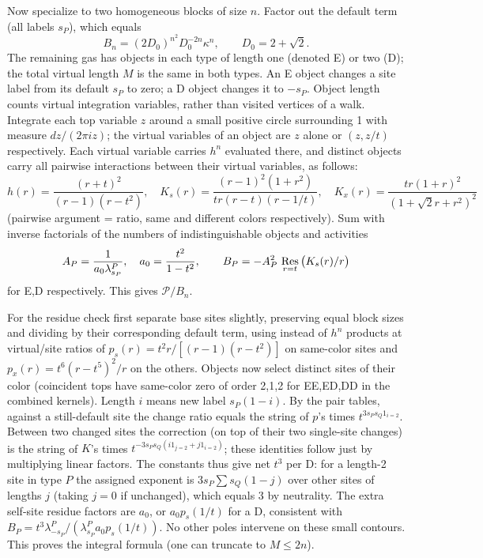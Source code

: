 Now specialize to two homogeneous blocks of size \(n\). Factor out the default term (all labels \(s_P\)), which equals
\[
 B_n=(2D_0)^{n^2}D_0^{-2n}\kappa^n,\qquad D_0=2+\sqrt2 .
\]
The remaining gas has objects in each type of length one (denoted E) or two (D); the total virtual length \(M\) is the same in both types. An E object changes a site label from its default $s_P$ to zero; a D object changes it to $-s_P$. Object length counts virtual integration variables, rather than visited vertices of a walk. Integrate each top variable \(z\) around a small positive circle surrounding 1 with measure \(dz/(2\pi i z)\); the virtual variables of an object are \(z\) alone or \((z,z/t)\) respectively. Each virtual variable carries \(h^n\) evaluated there, and distinct objects carry all pairwise interactions between their virtual variables, as follows:
\[
 h(r)=\frac{(r+t)^2}{(r-1)(r-t^2)},\quad
 K_s(r)=\frac{(r-1)^2(1+r^2)}{t r(r-t)(r-1/t)},\quad
 K_x(r)=\frac{t r(1+r)^2}{(1+\sqrt2 r+r^2)^2}
\]
(pairwise argument = ratio, same and different colors respectively). Sum with inverse factorials of the numbers of indistinguishable objects and activities
\[
 A_P=\frac{1}{a_0\lambda^P_{s_P}},\quad a_0=\frac{t^2}{1-t^2},\qquad
 B_P=-A_P^2\,\mathop{\rm Res}_{r=t}\big(K_s(r)/r\big)
\]
for E,D respectively. This gives \(\mathcal P/B_n\).

For the residue check first separate base sites slightly, preserving equal block sizes and dividing by their corresponding default term, using instead of \(h^n\) products at virtual/site ratios of \(p_s(r)=t^2 r/[(r-1)(r-t^2)]\) on same-color sites and \(p_x(r)=t^6(r-t^5)^2/r\) on the others. Objects now select distinct sites of their color (coincident tops have same-color zero of order 2,1,2 for EE,ED,DD in the combined kernels). Length \(i\) means new label \(s_P(1-i)\). By the pair tables, against a still-default site the change ratio equals the string of \(p\)'s times \(t^{3s_Ps_Q 1_{i=2}}\). Between two changed sites the correction (on top of their two single-site changes) is the string of \(K\)'s times
\(t^{-3s_Ps_Q(i 1_{j=2}+j 1_{i=2})}\); these identities follow just by multiplying linear factors. The constants thus give net \(t^3\) per D: for a length-2 site in type \(P\) the assigned exponent is \(3s_P\sum s_Q(1-j)\) over other sites of lengths \(j\) (taking \(j=0\) if unchanged), which equals 3 by neutrality. The extra self-site residue factors are \(a_0\), or \(a_0 p_s(1/t)\) for a D, consistent with \(B_P=t^3\lambda^P_{-s_P}/(\lambda^P_{s_P} a_0 p_s(1/t))\). No other poles intervene on these small contours. This proves the integral formula (one can truncate to \(M\le 2n\)).

